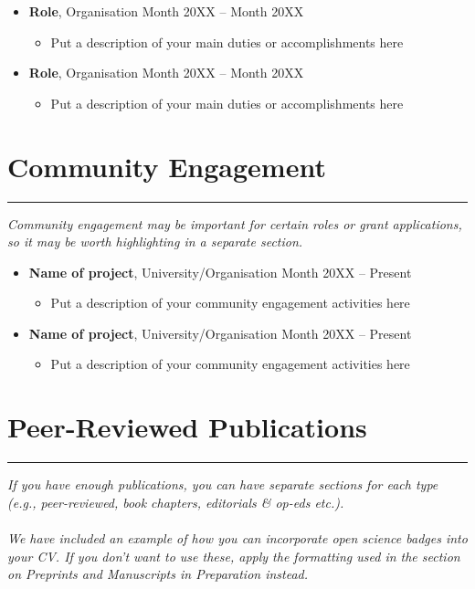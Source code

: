 \documentclass{article}
\begin{document}
\begin{itemize}[leftmargin=*]
    \item[] \textbf{Role}, Organisation \hfill Month 20XX -- Month 20XX
    \begin{itemize}
        \item Put a description of your main duties or accomplishments here
    \end{itemize}

    \item[] \textbf{Role}, Organisation \hfill Month 20XX -- Month 20XX
    \begin{itemize}
        \item Put a description of your main duties or accomplishments here
    \end{itemize}

\end{itemize}

\section*{Community Engagement}
\hrule
\vspace{1em}
\textit{Community engagement may be important for certain roles or grant applications, so it may be worth highlighting in a separate section.}

\begin{itemize}[leftmargin=*]
    \item[] \textbf{Name of project}, University/Organisation
    \hfill Month 20XX -- Present
    \begin{itemize}
        \item Put a description of your community engagement activities here
    \end{itemize}
    
    \item[] \textbf{Name of project}, University/Organisation
    \hfill Month 20XX -- Present
    \begin{itemize}
        \item Put a description of your community engagement activities here
    \end{itemize}
\end{itemize}

\section*{Peer-Reviewed Publications}
\hrule
\vspace{1em}
\textit{If you have enough publications, you can have separate sections for each type (e.g., peer-reviewed, book chapters, editorials \& op-eds etc.).}
\\\\
\textit{We have included an example of how you can incorporate open science badges into your CV. If you don't want to use these, apply the formatting used in the section on Preprints and Manuscripts in Preparation instead.}
\end{document}
